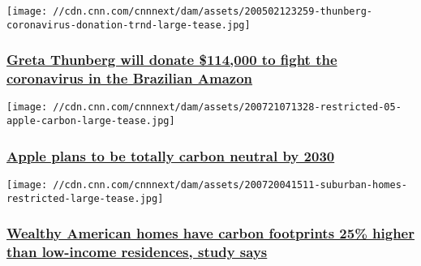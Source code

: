 \href{/2020/07/21/world/greta-thunberg-donate-covid-amazon-trnd/index.html}{}

\texttt{[image: //cdn.cnn.com/cnnnext/dam/assets/200502123259-thunberg-coronavirus-donation-trnd-large-tease.jpg]}

\hypertarget{greta-thunberg-will-donate-114000-to-fight-the-coronavirus-in-the-brazilian-amazon}{%
\subsubsection{\texorpdfstring{\href{/2020/07/21/world/greta-thunberg-donate-covid-amazon-trnd/index.html}{Greta
Thunberg will donate \$114,000 to fight the coronavirus in the Brazilian
Amazon}}{Greta Thunberg will donate \$114,000 to fight the coronavirus in the Brazilian Amazon}}\label{greta-thunberg-will-donate-114000-to-fight-the-coronavirus-in-the-brazilian-amazon}}

\href{/2020/07/21/tech/apple-climate-change/index.html}{}

\texttt{[image: //cdn.cnn.com/cnnnext/dam/assets/200721071328-restricted-05-apple-carbon-large-tease.jpg]}

\hypertarget{apple-plans-to-be-totally-carbon-neutral-by-2030-}{%
\subsubsection{\texorpdfstring{\href{/2020/07/21/tech/apple-climate-change/index.html}{Apple
plans to be totally carbon neutral by 2030
}}{Apple plans to be totally carbon neutral by 2030 }}\label{apple-plans-to-be-totally-carbon-neutral-by-2030-}}

\href{/2020/07/20/us/wealthy-american-homes-higher-carbon-footprints-trnd/index.html}{}

\texttt{[image: //cdn.cnn.com/cnnnext/dam/assets/200720041511-suburban-homes-restricted-large-tease.jpg]}

\hypertarget{wealthy-american-homes-have-carbon-footprints-25-higher-than-low-income-residences-study-says}{%
\subsubsection{\texorpdfstring{\href{/2020/07/20/us/wealthy-american-homes-higher-carbon-footprints-trnd/index.html}{Wealthy
American homes have carbon footprints 25\% higher than low-income
residences, study
says}}{Wealthy American homes have carbon footprints 25\% higher than low-income residences, study says}}\label{wealthy-american-homes-have-carbon-footprints-25-higher-than-low-income-residences-study-says}}

